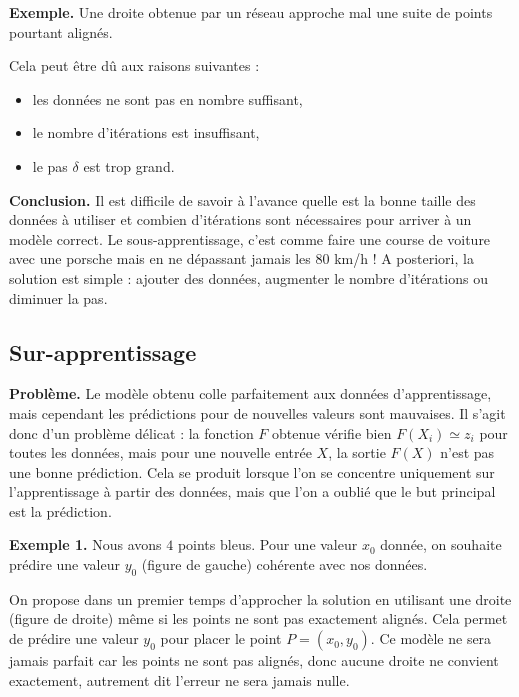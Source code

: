 \documentclass[11pt,class=report,crop=false]{standalone}
\begin{document}
\bigskip
\textbf{Exemple.} Une droite obtenue par un réseau approche mal une suite de points pourtant alignés.

Cela peut être dû aux raisons suivantes :
\begin{itemize}
  \item les données ne sont pas en nombre suffisant, 
  \item le nombre d'itérations est insuffisant,
  \item le pas $\delta$ est trop grand.
\end{itemize}

\bigskip

\textbf{Conclusion.} 
Il est difficile de savoir à l'avance quelle est la bonne taille
des données à utiliser et combien d'itérations sont nécessaires pour arriver à un modèle correct. Le sous-apprentissage, c'est comme faire une course de voiture avec une porsche mais en ne dépassant jamais les 80 km/h !
A posteriori, la solution est simple : ajouter des données, augmenter le nombre d'itérations ou diminuer la pas.

 
\subsection{Sur-apprentissage}


\textbf{Problème.} Le modèle obtenu \og{}colle\fg{} parfaitement aux données d'apprentissage, mais cependant les prédictions pour de nouvelles valeurs sont mauvaises.
Il s'agit donc d'un problème délicat : la fonction $F$ obtenue vérifie bien $F(X_i) \simeq z_i$ pour toutes les données, mais pour une nouvelle entrée $X$, la sortie $F(X)$ n'est pas une bonne prédiction. Cela se produit lorsque l'on se concentre uniquement sur l'apprentissage à partir des données, mais que l'on a oublié que le but principal est la prédiction.

\bigskip


\textbf{Exemple 1.} Nous avons $4$ points bleus.
Pour une valeur $x_0$ donnée, on souhaite prédire une valeur $y_0$ (figure de gauche) cohérente avec nos données.

On propose dans un premier temps d'approcher la solution en utilisant une droite (figure de droite) même si les points ne sont pas exactement alignés. Cela permet de prédire une valeur $y_0$ pour placer le point $P=(x_0,y_0)$.
Ce modèle ne sera jamais parfait car les points ne sont pas alignés, donc aucune droite ne convient exactement, autrement dit l'erreur ne sera jamais nulle.
\end{document}
